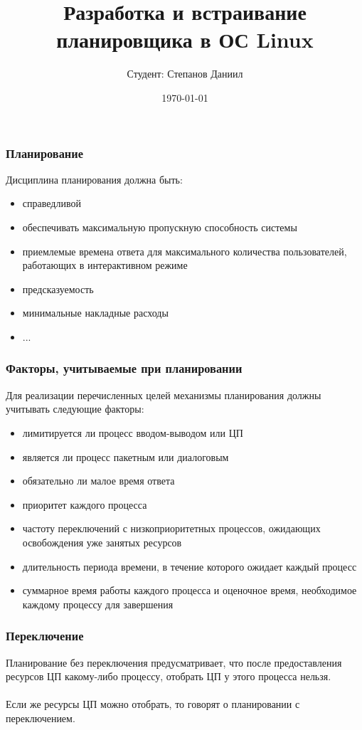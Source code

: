 \documentclass[10pt]{beamer}
\begin{document}
\title[Scheduler]{Разработка и встраивание планировщика в ОС Linux}
\author[Степанов Даниил]{Студент: Степанов Даниил}
\date{\today} 


\begin{frame}
\titlepage
\end{frame}



\begin{frame}\frametitle{Планирование}
Дисциплина планирования должна быть:
\begin{itemize}
\item справедливой
\item обеспечивать максимальную пропускную способность системы
\item приемлемые времена ответа для максимального количества пользователей, работающих в интерактивном режиме
\item предсказуемость
\item минимальные накладные расходы
\item ...
\end{itemize}
\end{frame}

\begin{frame}\frametitle{Факторы, учитываемые при планировании}
Для реализации перечисленных целей механизмы планирования должны учитывать следующие факторы:
\begin{itemize}
\item лимитируется ли процесс вводом-выводом или ЦП
\item является ли процесс пакетным или диалоговым
\item обязательно ли малое время ответа
\item приоритет каждого процесса
\item частоту переключений с низкоприоритетных процессов, ожидающих освобождения уже занятых ресурсов
\item длительность периода времени, в течение которого ожидает каждый процесс
\item суммарное время работы каждого процесса и оценочное время, необходимое каждому процессу для завершения
\end{itemize}
\end{frame}

\begin{frame}\frametitle{Переключение}
Планирование без переключения предусматривает, что после предоставления ресурсов ЦП какому-либо процессу, отобрать ЦП у этого процесса нельзя. \\ \ \\
Если же ресурсы ЦП можно отобрать, то говорят о планировании с переключением.
\end{frame}
\end{document}
